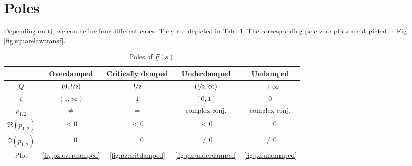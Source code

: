 \documentclass{article}[11pt]
\begin{document}
\section{Poles}

Depending on $Q$, we can define four different cases. 
They are depicted in Tab.~\ref{tab:pz}.
The corresponding pole-zero plots are depicted in 
Fig. \ref{fig:squarelawtransf}.

\begin{table}[H]
  \centering
  \caption{Poles of $\underline{F}(s)$}
  \begin{tabular}{ccccc}
  \toprule
                           & \textbf{Overdamped}               & \textbf{Critically damped} & \textbf{Underdamped}                    & \textbf{Undamped}     \\ \midrule
  $Q$                       & $\left(0, \nicefrac{1}{2}\right)$ & $\nicefrac{1}{2}$          & $\left(\nicefrac{1}{2}, \infty\right)$ & $\rightarrow \infty$  \\ 
  $\zeta$                   & $\left(1, \infty\right)$          & $1$                        & $\left(0, 1\right)$                    & $0$                   \\ \hline
  $p_{1,2}$                 & $\neq$                            & $=$                        & complex conj.                          & complex conj.         \\
  $\Re\left(p_{1,2}\right)$ & $<0$                              & $<0$                       & $<0$                                   & $=0$                  \\
  $\Im\left(p_{1,2}\right)$ & $=0$                              & $=0$                       & $\neq0$                                & $\neq0$               \\
  Plot                      & \ref{fig:pz:overdamped}           & \ref{fig:pz:critdamped}    & \ref{fig:pz:underdamped}               & \ref{fig:pz:undamped} \\ \toprule
  \end{tabular}
  \label{tab:pz}
\end{table}
\end{document}
